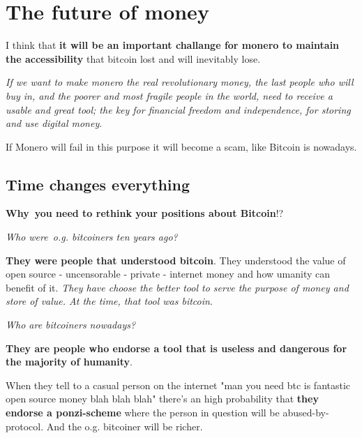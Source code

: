 \documentclass{article}
\begin{document}
\section{The future of money}\vspace{0.2cm}



I think that \textbf{it will be an important challange for monero to maintain the accessibility} that bitcoin lost and will inevitably lose.\vspace{0.3cm}



\emph{If we want to make monero the real revolutionary money, the last people who will buy in, and the poorer and most fragile people in the world, need to receive a usable and great tool; the key for financial freedom and independence, for storing and use digital money}.\vspace{0.4cm}

If Monero will fail in this purpose it will become a scam, like Bitcoin is nowadays.



\subsection{Time changes everything}\vspace{0.3cm}


\textbf{Why you need to rethink your positions about Bitcoin}!?\vspace{0.3cm}


\emph{Who were o.g. bitcoiners ten years ago?}\vspace{0.1cm}

\textbf{They were people that understood bitcoin}. They understood the value of open source - uncensorable - private - internet money and how umanity can benefit of it. \emph{They have choose the better tool to serve the purpose of money and store of value. At the time, that tool was bitcoin}.\vspace{0.3cm}


\emph{Who are bitcoiners nowadays?}\vspace{0.1cm}

\textbf{They are people who endorse a tool that is useless and dangerous for the majority of humanity}.

When they tell to a casual person on the internet "man you need btc is fantastic open source money blah blah blah" there's an high probability that \textbf{they endorse a ponzi-scheme} where the person in question will be abused-by-protocol. And the o.g. bitcoiner will be richer.\vspace{0.2cm}
\end{document}
